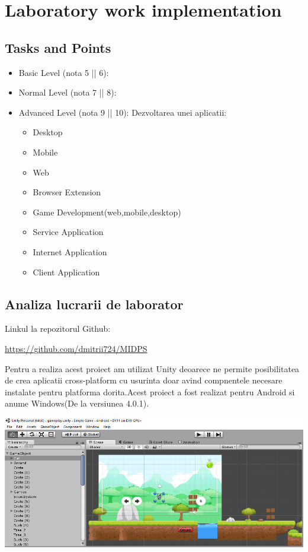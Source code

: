 \section{Laboratory work implementation}

\subsection{Tasks and Points}
\begin{itemize}
	\item Basic Level (nota 5 || 6):
	
	\item Normal Level (nota 7 || 8):
	
	\item Advanced Level (nota 9 || 10):
	Dezvoltarea unei aplicatii: 
	\begin{itemize}
		\item Desktop
    	\item Mobile	
    	\item Web
    	\item Browser Extension
    	\item Game Development(web,mobile,desktop)
    	\item Service Application
    	\item Internet Application
    	\item Client Application
	\end{itemize}
\end{itemize}
    



\subsection{Analiza lucrarii de laborator}

Linkul la repozitorul Github:\\
\begin{center}
\url{https://github.com/dmitrii724/MIDPS}
\end{center}

Pentru a realiza acest proiect am utilizat Unity deoarece ne permite posibilitatea de crea aplicatii cross-platform cu usurinta doar avind compnentele necesare instalate pentru platforma dorita.Acest proiect a fost realizat pentru Android si anume Windows(De la versiunea 4.0.1).
\begin{center}
\includegraphics[scale=0.5]{images/1}
\end{center}


